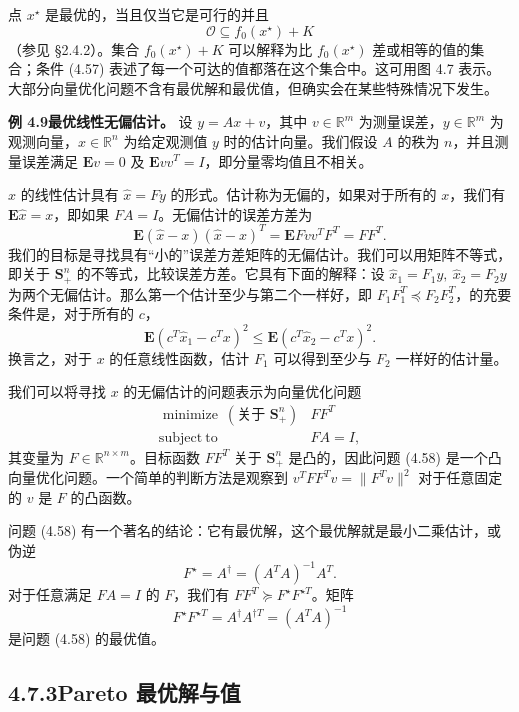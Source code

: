 \documentclass[UTF8,12pt,a4paper,fontset=fandol]{ctexart}
\begin{document}
点 $x^\star$ 是最优的，当且仅当它是可行的并且
\begin{equation}
\mathcal{O}\subseteq f_0(x^\star)+K
\tag{4.57}
\end{equation}
（参见 \S 2.4.2）。集合 $f_0(x^\star)+K$ 可以解释为比 $f_0(x^\star)$ 差或相等的值的集合；条件 (4.57) 表述了每一个可达的值都落在这个集合中。这可用图 4.7 表示。大部分向量优化问题不含有最优解和最优值，但确实会在某些特殊情况下发生。

\noindent\textbf{例 4.9\quad 最优线性无偏估计。}\quad
设 $y=Ax+v$，其中 $v\in\mathbb{R}^m$ 为测量误差，$y\in\mathbb{R}^m$ 为观测向量，$x\in\mathbb{R}^n$ 为给定观测值 $y$ 时的估计向量。我们假设 $A$ 的秩为 $n$，并且测量误差满足 $\mathbf{E}v=0$ 及 $\mathbf{E}vv^T=I$，即分量零均值且不相关。

$x$ 的线性估计具有 $\hat{x}=Fy$ 的形式。估计称为无偏的，如果对于所有的 $x$，我们有 $\mathbf{E}\hat{x}=x$，即如果 $FA=I$。无偏估计的误差方差为
\[
\mathbf{E}(\hat{x}-x)(\hat{x}-x)^T=\mathbf{E}Fvv^TF^T=FF^T.
\]
我们的目标是寻找具有“小的”误差方差矩阵的无偏估计。我们可以用矩阵不等式，即关于 $\mathbf{S}_+^n$ 的不等式，比较误差方差。它具有下面的解释：设 $\hat{x}_1=F_1y,\ \hat{x}_2=F_2y$ 为两个无偏估计。那么第一个估计至少与第二个一样好，即 $F_1F_1^T\preceq F_2F_2^T$，的充要条件是，对于所有的 $c$，
\[
\mathbf{E}(c^T\hat{x}_1-c^Tx)^2\leq \mathbf{E}(c^T\hat{x}_2-c^Tx)^2.
\]
换言之，对于 $x$ 的任意线性函数，估计 $F_1$ 可以得到至少与 $F_2$ 一样好的估计量。

我们可以将寻找 $x$ 的无偏估计的问题表示为向量优化问题
\begin{equation}
\begin{array}{ll}
\mathop{\mathrm{minimize}}\ (\text{关于 }\mathbf{S}_+^n) & FF^T\\
\mathrm{subject\ to} & FA=I,
\end{array}
\tag{4.58}
\end{equation}
其变量为 $F\in\mathbb{R}^{n\times m}$。目标函数 $FF^T$ 关于 $\mathbf{S}_+^n$ 是凸的，因此问题 (4.58) 是一个凸向量优化问题。一个简单的判断方法是观察到 $v^TFF^Tv=\|F^Tv\|^2$ 对于任意固定的 $v$ 是 $F$ 的凸函数。

问题 (4.58) 有一个著名的结论：它有最优解，这个最优解就是最小二乘估计，或伪逆
\[
F^\star=A^\dagger=(A^TA)^{-1}A^T.
\]
对于任意满足 $FA=I$ 的 $F$，我们有 $FF^T\succeq F^\star F^{\star T}$。矩阵
\[
F^\star F^{\star T}=A^\dagger A^{\dagger T}=(A^TA)^{-1}
\]
是问题 (4.58) 的最优值。

\subsection*{4.7.3\quad Pareto 最优解与值}
\end{document}
